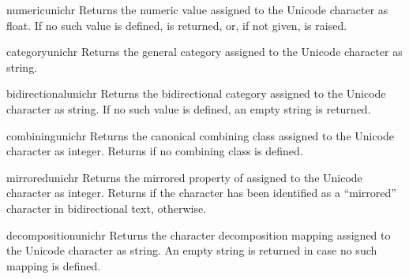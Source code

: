 \begin{funcdesc}{numeric}{unichr}
  Returns the numeric value assigned to the Unicode character
   as float. If no such value is defined,  is
  returned, or, if not given,  is raised.
\end{funcdesc}

\begin{funcdesc}{category}{unichr}
  Returns the general category assigned to the Unicode character
   as string.
\end{funcdesc}

\begin{funcdesc}{bidirectional}{unichr}
  Returns the bidirectional category assigned to the Unicode character
   as string. If no such value is defined, an empty string
  is returned.
\end{funcdesc}

\begin{funcdesc}{combining}{unichr}
  Returns the canonical combining class assigned to the Unicode
  character  as integer. Returns  if no combining
  class is defined.
\end{funcdesc}

\begin{funcdesc}{mirrored}{unichr}
  Returns the mirrored property of assigned to the Unicode character
   as integer. Returns  if the character has been
  identified as a ``mirrored'' character in bidirectional text,
   otherwise.
\end{funcdesc}

\begin{funcdesc}{decomposition}{unichr}
  Returns the character decomposition mapping assigned to the Unicode
  character  as string. An empty string is returned in case
  no such mapping is defined.
\end{funcdesc}

